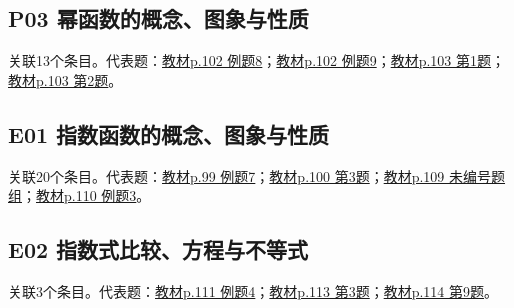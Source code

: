 \par\medskip\noindent\begin{minipage}{\linewidth}\subsection{P03 幂函数的概念、图象与性质}关联13个条目。代表题：\hyperref[XJ-B1-C04-EX-P102-Y0177]{教材p.102 例题8}；\hyperref[XJ-B1-C04-EX-P102-Y0669]{教材p.102 例题9}；\hyperref[XJ-B1-C04-PR-P103-Y0797]{教材p.103 第1题}；\hyperref[XJ-B1-C04-PR-P103-Y1012]{教材p.103 第2题}。\end{minipage}\par
\par\medskip\noindent\begin{minipage}{\linewidth}\subsection{E01 指数函数的概念、图象与性质}关联20个条目。代表题：\hyperref[XJ-B1-C04-EX-P099-Y1526]{教材p.99 例题7}；\hyperref[XJ-B1-C04-PR-P100-Y0660]{教材p.100 第3题}；\hyperref[XJ-B1-C04-TH-P109-Y0302]{教材p.109 未编号题组}；\hyperref[XJ-B1-C04-EX-P110-Y0319]{教材p.110 例题3}。\end{minipage}\par
\par\medskip\noindent\begin{minipage}{\linewidth}\subsection{E02 指数式比较、方程与不等式}关联3个条目。代表题：\hyperref[XJ-B1-C04-EX-P111-Y1422]{教材p.111 例题4}；\hyperref[XJ-B1-C04-PR-P113-Y0347]{教材p.113 第3题}；\hyperref[XJ-B1-C04-HW-P114-Y0711]{教材p.114 第9题}。\end{minipage}\par
